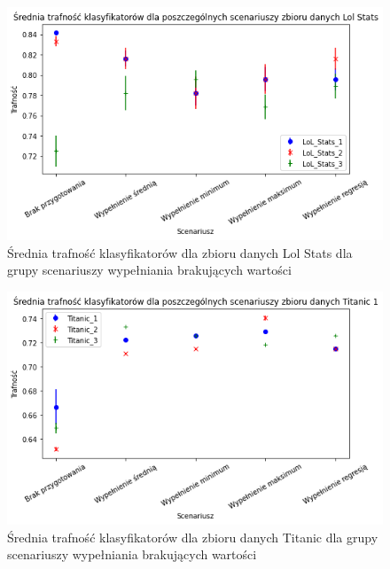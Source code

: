 \documentclass{book}
\begin{document}
\begin{figure}[H]
    \centerline{\includegraphics[scale=0.5]{Lol_Stats_Avg_Wypełnienie_brakujących}}
    \centering
    \caption{Średnia trafność klasyfikatorów dla zbioru danych Lol Stats 
    dla grupy scenariuszy wypełniania brakujących wartości}
    \end{figure}

\begin{figure}[H]
    \centerline{\includegraphics[scale=0.5]{Titanic_Avg_Wypełnienie_brakujących}}
    \centering
    \caption{Średnia trafność klasyfikatorów dla zbioru danych Titanic 
    dla grupy scenariuszy wypełniania brakujących wartości}
    \end{figure}
\end{document}
